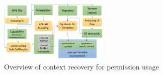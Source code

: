 

 \begin{figure}[H]%
\includegraphics[width=0.46\textwidth]{User_Perceived.png}%
\caption{Overview of context recovery for permission usage
 }%
\label{fig:User_Perceived}%
\end{figure}

